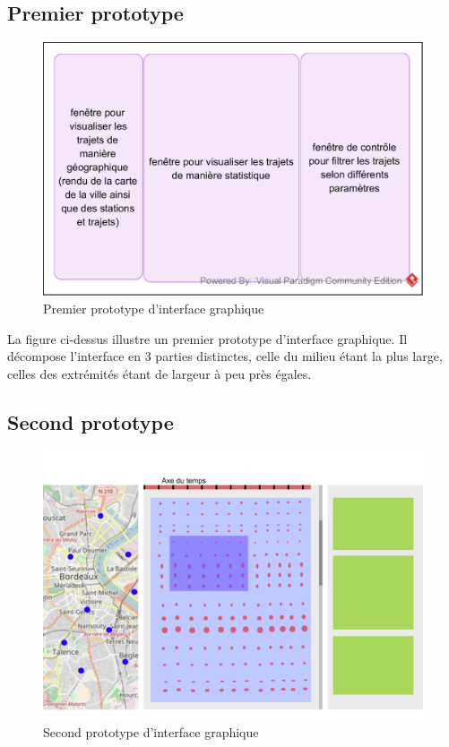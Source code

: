 \documentclass[12pt]{article}
\begin{document}
		\subsection{Premier prototype}
		\begin{figure}[!h]
		\begin{center}
		\includegraphics[scale=1]{dia_proto-interface_1.png}
		\caption{Premier prototype d’interface graphique}
		\end{center}
		\end{figure}
		
		La figure ci-dessus illustre un premier prototype d’interface graphique. Il décompose l’interface en 3 parties distinctes, celle du milieu étant la plus large, celles des extrémités étant de largeur à peu près égales.
		
		\subsection{Second prototype}
		\begin{figure}[!h]
		\begin{center}
		\includegraphics[scale=.5]{dia_proto-interface_2.png}
		\caption{Second prototype d’interface graphique}
		\label{fig:proto_int_2}
		\end{center}
		\end{figure}
		
\end{document}

